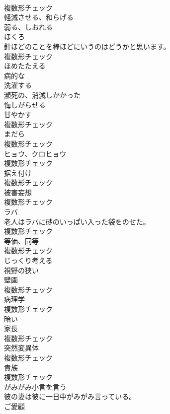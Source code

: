\documentclass[8pt]{extreport}
\begin{document}
\begin{CJK}{UTF8}{min}
\\	複数形チェック
\\	[動詞]	軽減させる、和らげる	
\\	[動詞]	弱る、しおれる	
\\	[名詞]	ほくろ	
\\	針ほどのことを棒ほどにいうのはどうかと思います。	
\\	複数形チェック
\\	[動詞]	ほめたたえる	
\\	[形容詞]	病的な	
\\	[動詞]	洗濯する	
\\	[形容詞]	瀕死の、消滅しかかった	
\\	[動詞]	悔しがらせる	
\\	[名詞]	甘やかす	
\\	複数形チェック
\\	[名詞]	まだら	
\\	複数形チェック
\\	[名詞]	ヒョウ、クロヒョウ	
\\	複数形チェック
\\	[名詞]	据え付け	
\\	複数形チェック
\\	[名詞]	被害妄想	
\\	複数形チェック
\\	[名詞]	ラバ	
\\	老人はラバに砂のいっぱい入った袋をのせた。	
\\	複数形チェック
\\	[名詞]	等価、同等	
\\	複数形チェック
\\	[動詞]	じっくり考える	
\\	[形容詞]	視野の狭い	
\\	[名詞]	壁画	
\\	複数形チェック
\\	[名詞]	病理学	
\\	複数形チェック
\\	[形容詞]	暗い	
\\	[名詞]	家⻑	
\\	複数形チェック
\\	[名詞]	突然変異体	
\\	複数形チェック
\\	[名詞]	貴族	
\\	複数形チェック
\\	[動詞]	がみがみ小言を言う	
\\	彼の妻は彼に一日中がみがみ言っている。	
\\	[名詞]	ご愛顧	

\end{CJK}
\end{document}
